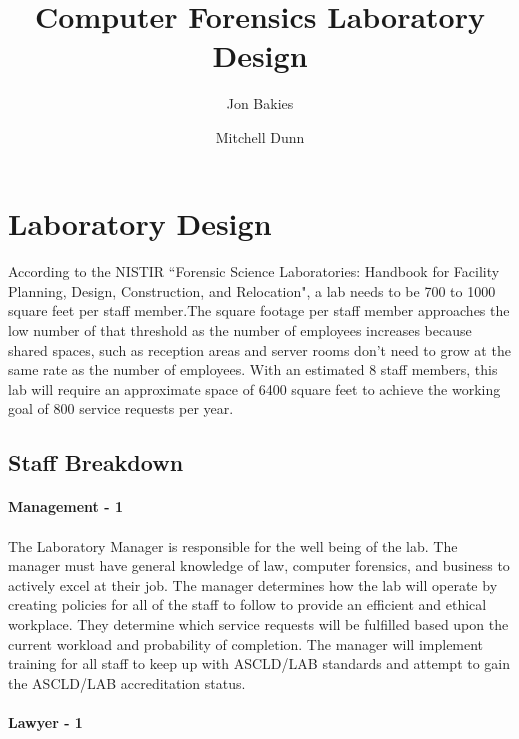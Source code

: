 \documentclass{article}
\begin{document}
\title{Computer Forensics Laboratory Design}
\author{Jon Bakies \and Mitchell Dunn} 

\maketitle
\newpage

\tableofcontents
\newpage


\section{Laboratory Design}
\paragraph{} According to the NISTIR ``Forensic Science Laboratories: Handbook for Facility Planning, Design, Construction, and Relocation", a lab needs to be 700 to 1000 square feet per staff member.The square footage per staff member approaches the low number of that threshold as the number of employees increases because shared spaces, such as reception areas and server rooms don't need to grow at the same rate as the number of employees.  With an estimated 8 staff members, this lab will require an approximate space of 6400 square feet to achieve the working goal of 800 service requests per year.
\subsection{Staff Breakdown}
\paragraph {Management - 1} 
\paragraph{} The Laboratory Manager is responsible for the well being of the lab.  The manager must have general knowledge of law, computer forensics, and business to actively excel at their job.  The manager determines how the lab will operate by creating policies for all of the staff to follow to provide an efficient and ethical workplace.  They determine which service requests will be fulfilled based upon the current workload and probability of completion. The manager will implement training for all staff to keep up with ASCLD/LAB standards and attempt to gain the ASCLD/LAB accreditation status.  

\paragraph{Lawyer - 1} 
\end{document}
